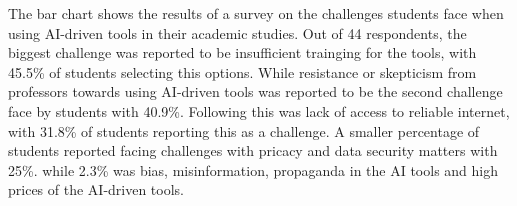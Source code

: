 The bar chart shows the results of a survey on the challenges students
face when using AI-driven tools in their academic studies. Out of 44 respondents,
the biggest challenge was reported to be insufficient trainging for the
tools, with 45.5\% of students selecting this options. While resistance or skepticism
from professors towards using AI-driven tools was reported to be the second challenge
face by students with 40.9\%.
Following this was lack of access to reliable internet, with 31.8\% of students
reporting this as a challenge.
A smaller percentage of students reported facing challenges with pricacy and data security matters
with 25\%. while 2.3\% was bias, misinformation, propaganda in the AI tools and high prices of the AI-driven tools.

